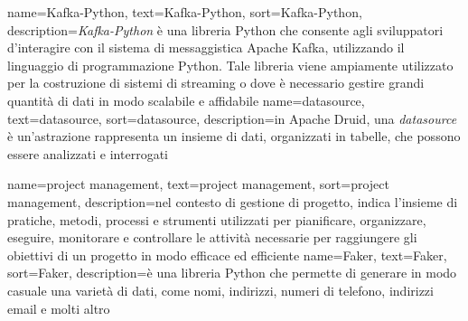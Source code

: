 {
    name={Kafka-Python},
    text=Kafka-Python,
    sort=Kafka-Python,
    description={\textit{Kafka-Python} è una libreria Python che consente agli sviluppatori d'interagire con il sistema di messaggistica Apache Kafka, utilizzando il linguaggio di programmazione Python. Tale libreria viene ampiamente utilizzato per la costruzione di sistemi di streaming o dove è necessario gestire grandi quantità di dati in modo scalabile e affidabile}
}
{
    name={datasource},
    text=datasource,
    sort=datasource,
    description={in Apache Druid, una \textit{datasource} è un'astrazione rappresenta un insieme di dati, organizzati in tabelle, che possono essere analizzati e interrogati}
}

{
    name={project management},
    text=project management,
    sort=project management,
    description={nel contesto di gestione di progetto, indica l'insieme di pratiche, metodi, processi e strumenti utilizzati per pianificare, organizzare, eseguire, monitorare e controllare le attività necessarie per raggiungere gli obiettivi di un progetto in modo efficace ed efficiente}
}
{
    name={Faker},
    text=Faker,
    sort=Faker,
    description={è una libreria Python che permette di generare in modo casuale una varietà di dati, come nomi, indirizzi, numeri di telefono, indirizzi email e molti altro}
}